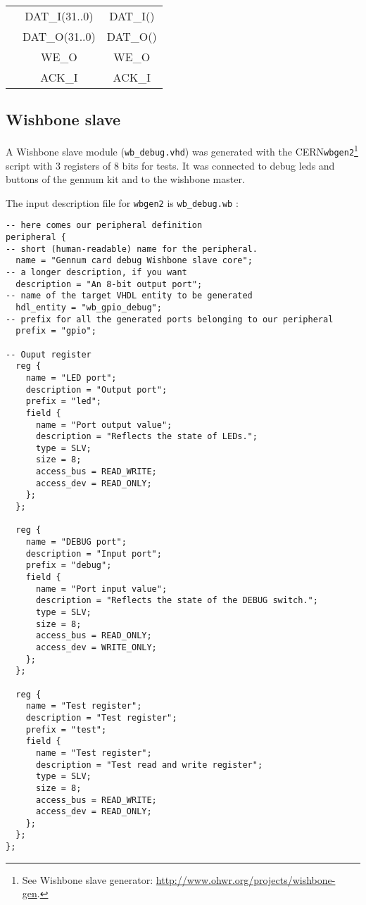 \documentclass[10pt,a4paper]{cerndoc}
\begin{document}
\begin{tabularx}{\textwidth}{|X|cc|}
&  DAT\_I(31..0) &  DAT\_I()                                                                              \\ %
&  DAT\_O(31..0) &  DAT\_O()                                                                              \\ %
&  WE\_O         &  WE\_O                                                                                 \\ %
&  ACK\_I        &  ACK\_I                                                                                \\ %
\hline


\end{tabularx}

\clearpage   
  \subsection{Wishbone slave}  
A Wishbone slave module (\verb+wb_debug.vhd+) was generated with the CERN\verb+wbgen2+\footnote{See Wishbone slave generator: \href{http://www.ohwr.org/projects/wishbone-gen}{http://www.ohwr.org/projects/wishbone-gen}.} script with 3 registers of 8 bits for tests.
It was connected to debug leds and buttons of the gennum kit and to the wishbone master.   

The input description file for \verb+wbgen2+ is \verb+wb_debug.wb+ :
\begin{lstlisting}[basicstyle=\footnotesize\ttfamily]
-- here comes our peripheral definition
peripheral {
-- short (human-readable) name for the peripheral.
  name = "Gennum card debug Wishbone slave core";
-- a longer description, if you want
  description = "An 8-bit output port";
-- name of the target VHDL entity to be generated
  hdl_entity = "wb_gpio_debug";
-- prefix for all the generated ports belonging to our peripheral
  prefix = "gpio";

-- Ouput register
  reg {
    name = "LED port";
    description = "Output port";
    prefix = "led";
    field {
      name = "Port output value";
      description = "Reflects the state of LEDs.";
      type = SLV;
      size = 8;
      access_bus = READ_WRITE;
      access_dev = READ_ONLY;
    };
  };
		
  reg {
    name = "DEBUG port";
    description = "Input port";
    prefix = "debug";
    field {
      name = "Port input value";
      description = "Reflects the state of the DEBUG switch.";
      type = SLV;
      size = 8;
      access_bus = READ_ONLY;
      access_dev = WRITE_ONLY;
    };
  };
		
  reg {
    name = "Test register";
    description = "Test register";	
    prefix = "test";
    field {
      name = "Test register";
      description = "Test read and write register";
      type = SLV;
      size = 8;
      access_bus = READ_WRITE;
      access_dev = READ_ONLY;
    };
  };
};   
\end{lstlisting}   
   
\end{document}
